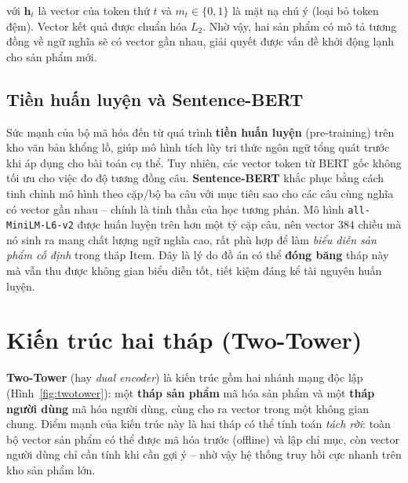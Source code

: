 với $\mathbf{h}_t$ là vector của token thứ $t$ và $m_t \in \{0, 1\}$ là mặt nạ chú ý
(loại bỏ token đệm). Vector kết quả được chuẩn hóa $L_2$. Nhờ vậy, hai sản phẩm có
mô tả tương đồng về ngữ nghĩa sẽ có vector gần nhau, giải quyết được vấn đề khởi động
lạnh cho sản phẩm mới.

\subsection{Tiền huấn luyện và Sentence-BERT}

Sức mạnh của bộ mã hóa đến từ quá trình \textbf{tiền huấn luyện} (pre-training) trên
kho văn bản khổng lồ, giúp mô hình tích lũy tri thức ngôn ngữ tổng quát trước khi áp
dụng cho bài toán cụ thể. Tuy nhiên, các vector token từ BERT gốc không tối ưu cho
việc đo độ tương đồng câu. \textbf{Sentence-BERT} khắc phục bằng cách tinh chỉnh mô
hình theo cặp/bộ ba câu với mục tiêu sao cho các câu cùng nghĩa có vector gần nhau --
chính là tinh thần của học tương phản. Mô hình \texttt{all-MiniLM-L6-v2} được huấn
luyện trên hơn một tỷ cặp câu, nên vector $384$ chiều mà nó sinh ra mang chất lượng
ngữ nghĩa cao, rất phù hợp để làm \textit{biểu diễn sản phẩm cố định} trong tháp Item.
Đây là lý do đồ án có thể \textbf{đóng băng} tháp này mà vẫn thu được không gian biểu
diễn tốt, tiết kiệm đáng kể tài nguyên huấn luyện.

\section{Kiến trúc hai tháp (Two-Tower)}
\label{sec:twotower}

\textbf{Two-Tower} (hay \textit{dual encoder}) là kiến trúc gồm hai nhánh mạng độc
lập (Hình~\ref{fig:twotower}): một \textbf{tháp sản phẩm} mã hóa sản phẩm và một
\textbf{tháp người dùng} mã hóa người dùng, cùng cho ra vector trong một không gian
chung. Điểm mạnh của kiến trúc này là hai tháp có thể tính toán \textit{tách rời}:
toàn bộ vector sản phẩm có thể được mã hóa trước (offline) và lập chỉ mục, còn vector
người dùng chỉ cần tính khi cần gợi ý -- nhờ vậy hệ thống truy hồi cực nhanh trên kho
sản phẩm lớn.


